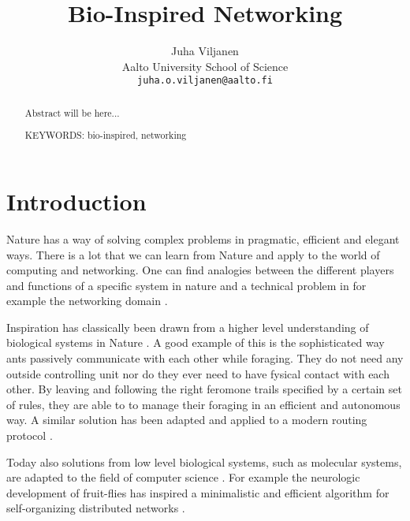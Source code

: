 \documentclass{IWORK2014}
\begin{document}

\title{Bio-Inspired Networking}

\author{Juha Viljanen\\
        Aalto University School of Science \\
	\texttt{juha.o.viljanen@aalto.fi}}
\maketitle


\begin{abstract}
  Abstract will be here...

\vspace{3mm}
\noindent KEYWORDS: bio-inspired, networking

\end{abstract}



\section{Introduction}

Nature has a way of solving complex problems in pragmatic, efficient and elegant ways. There is a lot that we can learn from Nature and apply to the world of computing and networking. One can find analogies between the different players and functions of a specific system in nature and a technical problem in for example the networking domain \cite{dressler2010bio}.

Inspiration has classically been drawn from a higher level understanding of biological systems in Nature \cite{kroeker2011biology}. A good example of this is the sophisticated way ants passively communicate with each other while foraging. They do not need any outside controlling unit nor do they ever need to have fysical contact with each other. By leaving and following the right feromone trails specified by a certain set of rules, they are able to to manage their foraging in an efficient and autonomous way. A similar solution has been adapted and applied to a modern routing protocol \cite{dressler2010bio}.

Today also solutions from low level biological systems, such as molecular systems, are adapted to the field of computer science \cite{kroeker2011biology}. For example the neurologic development of fruit-flies has inspired a minimalistic and efficient algorithm for self-organizing distributed networks \cite{kroeker2011biology}.
\end{document}
